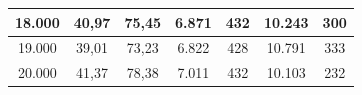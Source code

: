 \begin{table}[ht]
\begin{tabular}{|c|c|c|c|c|c|c|}
18.000              & 40,97                                                             & 75,45                                                          & 6.871              & 432             & 10.243             & 300             \\ \hline
19.000              & 39,01                                                             & 73,23                                                          & 6.822              & 428             & 10.791             & 333             \\ \hline
20.000              & 41,37                                                             & 78,38                                                          & 7.011              & 432             & 10.103             & 232             \\ \hline
\end{tabular}
\end{table}
